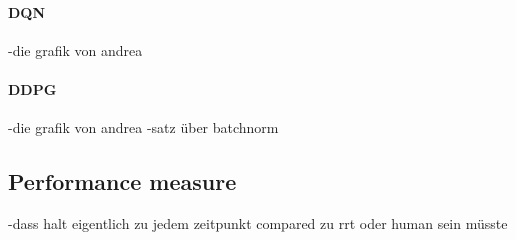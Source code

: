 \paragraph{DQN}

-die grafik von andrea


\paragraph{DDPG}

-die grafik von andrea
-satz über batchnorm



\subsection{Performance measure}

-dass halt eigentlich zu jedem zeitpunkt compared zu rrt oder human sein müsste



%
%
%




%
%


